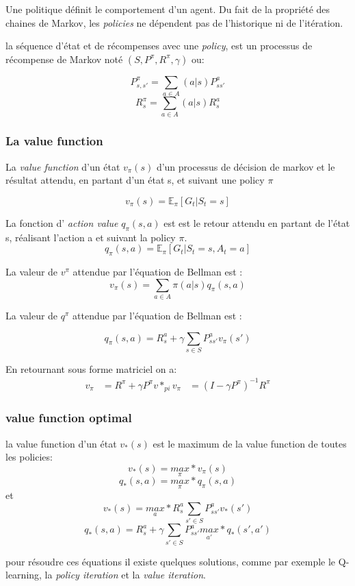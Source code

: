 \documentclass[a4paper,10pt]{article}
\begin{document}
Une politique définit le comportement d'un agent. Du fait de la propriété des chaines de Markov, les \textit{policies} ne dépendent pas de l'historique ni de l'itération.
\par
la séquence d'état et de récompenses avec une \textit{policy}, est un processus de récompense de Markov noté $(S,P^{\pi},R^{\pi},\gamma)$ ou:
\par
\[
P^{\pi }_{s,s'}= \sum_{a \in A} (a|s)P^{a}_{ss'}
\]
\[
R^{\pi}_{s}=\sum_{a \in A} (a|s)R^{a}_{s}
\]


\subsubsection{La value function}
La\textit{ value function} d'un état $v_{\pi}(s)$ d'un processus de décision de markov et le résultat attendu, en partant d'un état s, et suivant une policy $\pi$

\[
v_{\pi}(s) = \mathbb{E}_{\pi}[G_t|S_t = s]
\]

La fonction d' \textit{action value} $q_{\pi}(s,a)$ est est le retour attendu en partant de l'état s, réalisant l'action a et suivant la policy $\pi$.
\[
q_{\pi}(s,a) = \mathbb{E}_{\pi}[G_t|S_t =s,A_t =a]
\]

La valeur de $v^{\pi}$ attendue par l'équation de Bellman est :
\[
v_{\pi}(s)= \sum_{a \in A} \pi (a|s)q_{\pi}(s,a)
\]

La valeur de $q^{\pi}$ attendue par l'équation de Bellman est :

\[
q_{\pi}(s,a)= R^{a}_s + \gamma \sum_{s \in S} P^{a}_{ss'}v_{\pi}(s')
\]

En retournant sous forme matriciel on a:
\[
\begin{aligned}
v_{\pi} &= R^{\pi} + \gamma P^{\pi} v*_{pi}
v_{\pi} &= (I - \gamma P^{\pi})^{-1} R^{\pi}
\end{aligned}
\]
\subsubsection{value function optimal}

la value function d'un état $v_*(s)$ est le maximum de la value function de toutes les policies:
\[
 v_*(s) = \underset{\pi}{max}* v_{\pi}(s) 
\]
\[
 q_*(s,a) =\underset{\pi}{max}*q_{\pi}(s,a) 
\]
et
\[
  v_*(s) = \underset{a}{max}*R^{a}_s \sum_{s' \in S} P^{a}_{ss'} v_* (s') 
\]
\[
q_*(s,a) = R^{a}_s + \gamma \sum_{s' \in S} P^{a}_{ss'} \underset{a'}{max}* q_*(s',a') 
\]

pour résoudre ces équations il existe quelques solutions, comme par exemple le Q-learning, la \textit{policy iteration} et la \textit{value iteration}.
\end{document}
